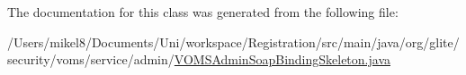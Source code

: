 The documentation for this class was generated from the following file:\begin{DoxyCompactItemize}
\item 
/Users/mikel8/Documents/Uni/workspace/Registration/src/main/java/org/glite/security/voms/service/admin/\hyperlink{VOMSAdminSoapBindingSkeleton_8java}{VOMSAdminSoapBindingSkeleton.java}\end{DoxyCompactItemize}
